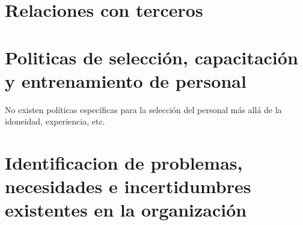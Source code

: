 \documentclass[a4paper,11pt,oneside]{article}
\begin{document}
\section{Relaciones con terceros}

\section{Politicas de selección, capacitación y entrenamiento de personal}

No existen políticas específicas para la selección del personal más allá de la idoneidad, experiencia, etc.

\section{Identificacion de problemas, necesidades e incertidumbres existentes en la organización}
\end{document}
